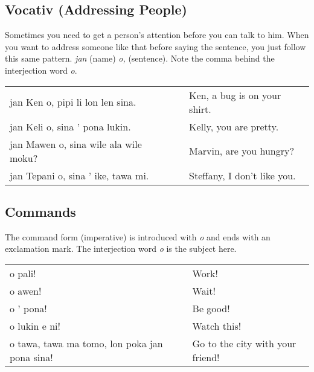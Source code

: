 \newpage
%
\subsection*{Vocativ (Addressing People)}
%
%
Sometimes you need to get a person's attention before you can talk to him. 
When you want to address someone like that before saying the sentence, you just follow this same pattern. 
\textit{jan} (name) \textit{o,} (sentence). 
Note the comma behind the interjection word \textit{o}. 

\begin{supertabular}{p{5,5cm}|ll}
jan Ken o, pipi li lon len sina. && Ken, a bug is on your shirt. \\
jan Keli o, sina ' pona lukin. && Kelly, you are pretty. \\
jan Mawen o, sina wile ala wile moku? && Marvin, are you hungry? \\
jan Tepani o, sina ' ike, tawa mi. && Steffany, I don't like you. \\
\end{supertabular} 
%
\subsection*{Commands}
%
%

The command form (imperative) is introduced with \textit{o} and ends with an exclamation mark.
The interjection word \textit{o} is the subject here.

\begin{supertabular}{p{5,5cm}|ll}
o pali! && Work! \\
o awen! && Wait! \\
o ' pona! && Be good! \\
o lukin e ni! && Watch this! \\
o tawa, tawa ma tomo, lon poka jan pona sina! && Go to the city with your friend! \\
\end{supertabular} 

